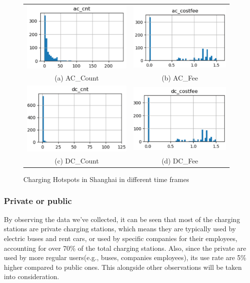 \begin{figure}[!htbp]
	\begin{tabular}{cc}
		\includegraphics[width=0.45\columnwidth]{./figures/ac_cnt.pdf} &  \includegraphics[width=0.45\columnwidth]{./figures/ac_fee.pdf} \\
		(a) AC\_Count & (b) AC\_Fee \\[6pt] 
		\includegraphics[width=0.45\columnwidth]{./figures/dc_cnt.pdf} &
		\includegraphics[width=0.45\columnwidth]{./figures/dc_fee.pdf} \\
		(c) DC\_Count & (d) DC\_Fee
	\end{tabular}
	\centering
	\caption{Charging Hotspots in Shanghai in different time frames}
	\label{fig5}
\end{figure}

\subsubsection{Private or public}
By observing the data we've collected, it can be seen that most of the charging stations are private charging stations, which means they are typically used by electric buses and rent cars, or used by specific companies for their employees, accounting for over 70\% of the total charging stations. Also, since the private are used by more regular users(e.g., buses, companies employees), its use rate are 5\% higher compared to public ones. This alongside other observations will be taken into consideration.

